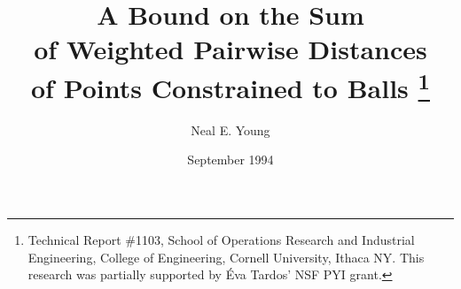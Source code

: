 \documentclass[11pt]{article}
\title{A Bound on the Sum 
  \\ of Weighted Pairwise Distances
  \\ of Points Constrained to Balls
  \thanks{
    Technical Report \#1103,
    School of Operations Research and Industrial Engineering,
    College of Engineering, Cornell University, Ithaca NY.
    This research was partially supported by \'Eva Tardos' NSF PYI grant.}
}
\date{September 1994}
\author{
  Neal E. Young
}
\newcommand\real{{\rm I\kern-0.2em\rm R}}
\newenvironment{opt}[2]{
\samepage
\renewcommand{\arraystretch}{1.3}

}
\begin{document}
\maketitle

\begin{abstract}
  We consider the problem of choosing Euclidean points
  to maximize the sum of their weighted pairwise distances,
  when each point is constrained to a ball centered at the origin.
  We derive a dual minimization problem and show strong duality holds
  (i.e., the resulting upper bound is tight)
  when some locally optimal configuration of points is affinely independent.
  We sketch a polynomial time algorithm 
  for finding a near-optimal set of points.
\end{abstract}

\section{Introduction}
We consider the following maximization problem :
\begin{opt}{}{\sum_{1 \le i < j \le n} w(i,j)d(p_i, p_j)}
  p_i & \in & \real^{n-1}  & (i=1,..,n);
  \\ ||p_i|| & \le & \ell(i)     & (i=1,..,n).
\end{opt}
Here each  and each  is fixed, 
 denotes the Euclidean distance between points  and ,
and  denotes the Euclidean length (distance from the origin)
of point .

We derive the following dual problem :
\begin{opt}{}{
    \sqrt{\sum_{1\le i < j \le n} \frac{w^2(i,j)}{x_i x_j}}
    \times \sqrt{\sum_{i=1}^n \ell^2(i) x_i}
    \times \sqrt{\sum_{i=1}^n x_i}}
  x_i & \in & \real & (i=1,..,n);
  \\ x_i & \ge & 0     & (i=1,..,n).
\end{opt}
Throughout the paper,  is defined to be .

We show that the value of the maximization problem
is at most the value of the minimization problem.
We use a physical interpretation of the two problems to show that
the values are equal provided the maximization problem
admits a set of points  that is both affinely independent
and stationary
(i.e., the gradient of the objective function is a nonnegative combination
of the gradients of the active constraints,
a necessary condition at any local maximizer of ).

We sketch how a near-optimal solution to the problem
can be found in polynomial time via the ellipsoid method.
\end{document}
